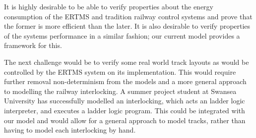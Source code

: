 It is highly desirable to be able to verify properties about the energy consumption of the ERTMS and tradition railway control systems and prove that the former is more efficient than the later. It is also desirable to verify properties of the systems performance in a similar fashion; our current model provides a framework for this.

The next challenge would be to verify  some real world track layouts as would be controlled by the ERTMS system on its implementation. This would require further removal non-determinism from the models and a more general approach to modelling the railway interlocking. A summer project student at Swansea University has successfully modelled an interlocking, which acts an ladder logic interpreter, and executes a ladder logic program. This could be integrated with our model and would allow for a general approach to model tracks, rather than having to model each interlocking by hand.

